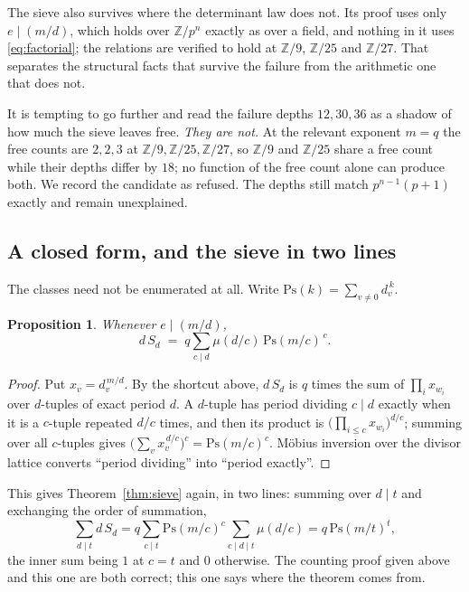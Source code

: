 \documentclass[11pt]{article}
\theoremstyle{plain}
\newtheorem{proposition}[theorem]{Proposition}
\theoremstyle{definition}
\newcommand{\ZZ}{\mathbb Z}
\begin{document}
The sieve also survives where the determinant law does not. Its proof uses only
$e\mid(m/d)$, which holds over $\ZZ/p^{n}$ exactly as over a field, and nothing
in it uses \eqref{eq:factorial}; the relations are verified to hold at
$\ZZ/9$, $\ZZ/25$ and $\ZZ/27$. That separates the structural facts that
survive the failure from the arithmetic one that does not.

It is tempting to go further and read the failure depths $12,30,36$ as a shadow
of how much the sieve leaves free. \emph{They are not.} At the relevant
exponent $m=q$ the free counts are $2,2,3$ at $\ZZ/9,\ZZ/25,\ZZ/27$, so
$\ZZ/9$ and $\ZZ/25$ share a free count while their depths differ by $18$; no
function of the free count alone can produce both. We record the candidate as
refused. The depths still match $p^{n-1}(p+1)$ exactly and remain unexplained.

\subsection{A closed form, and the sieve in two lines}
\label{sec:closedform}

The classes need not be enumerated at all. Write
$\mathrm{Ps}(k)=\sum_{v\neq0}d_v^{\,k}$.

\begin{proposition}\label{prop:closed}
Whenever $e\mid(m/d)$,
\[
d\,S_d \;=\; q\sum_{c\mid d}\mu(d/c)\,\mathrm{Ps}(m/c)^{\,c}.
\]
\end{proposition}

\begin{proof}
Put $x_v=d_v^{\,m/d}$. By the shortcut above, $d\,S_d$ is $q$ times the sum of
$\prod_i x_{w_i}$ over $d$-tuples of exact period $d$. A $d$-tuple has period
dividing $c\mid d$ exactly when it is a $c$-tuple repeated $d/c$ times, and
then its product is $\bigl(\prod_{i\le c}x_{w_i}\bigr)^{d/c}$; summing over all
$c$-tuples gives $\bigl(\sum_v x_v^{\,d/c}\bigr)^{c}=\mathrm{Ps}(m/c)^{c}$.
M\"obius inversion over the divisor lattice converts ``period dividing'' into
``period exactly''.
\end{proof}

\noindent This gives Theorem~\ref{thm:sieve} again, in two lines: summing over
$d\mid t$ and exchanging the order of summation,
\[
\sum_{d\mid t}d\,S_d
=q\sum_{c\mid t}\mathrm{Ps}(m/c)^{c}\!\!\sum_{c\mid d\mid t}\!\!\mu(d/c)
=q\,\mathrm{Ps}(m/t)^{t},
\]
the inner sum being $1$ at $c=t$ and $0$ otherwise. The counting proof given
above and this one are both correct; this one says where the theorem comes
from.
\end{document}
